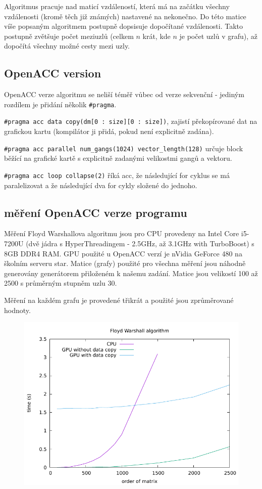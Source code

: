 \documentclass[11pt, fleqn]{article}
\begin{document}
Algoritmus pracuje nad maticí vzdáleností, která má na začátku všechny vzdálenosti (kromě těch již známých) nastavené na nekonečno. Do této matice víše popsaným algoritmem postupně dopsisuje dopočítané vzdálenosti. Takto postupně zvětšuje počet meziuzlů (celkem $n$ krát, kde $n$ je počet uzlů v grafu), až dopočítá všechny možné cesty mezi uzly.


\subsection{OpenACC version}
OpenACC verze algoritmu se neliší téměř vůbec od verze sekvenční - jediným rozdílem je přidání několik \lstinline{#pragma}.

\lstinline{#pragma acc data copy(dm[0 : size][0 : size])}, zajistí překopírované dat na grafickou kartu (kompilátor ji přidá, pokud není explicitně zadána).

\lstinline{#pragma acc parallel num_gangs(1024) vector_length(128)} určuje block běžící na grafické kartě s explicitně zadanými velikostmi gangů a vektoru.

\lstinline{#pragma acc loop collapse(2)} říká acc, že následující for cyklus se má paralelizovat a že následující dva for cykly složené do jednoho.


\subsection{měření OpenACC verze programu}

Měření Floyd Warshallova algoritmu jsou pro CPU provedeny na Intel Core i5-7200U (dvě jádra s HyperThreadingem - 2.5GHz, až 3.1GHz with TurboBoost) s 8GB DDR4 RAM. GPU použité u OpenACC verzí je nVidia GeForce 480 na školním serveru star. Matice (grafy) použité pro všechna měření jsou náhodně generovány generátorem přiloženém k našemu zadání. Matice jsou velikostí 100 až 2500 s průměrným stupněm uzlu 30.

Měření na každém grafu je provedené třikrát a použité jsou zprůměrované hodnoty.

\begin{figure}
  \centering
  \includegraphics[width=.7\linewidth]{../results/Floyd_Warshall.pdf}
  \label{fig:fw1}
\end{figure}
\end{document}
